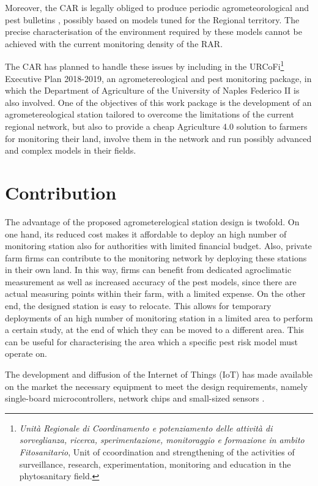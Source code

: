 \documentclass[conference]{IEEEtran}
\begin{document}
Moreover, the CAR is legally obliged to produce periodic agrometeorological and pest bulletins \cite{eu-directive:pesticide}, possibly based on models tuned for the Regional territory.
The precise characterisation of the environment required by these models cannot be achieved with the current monitoring density of the RAR. 

The CAR has planned to handle these issues by including in the URCoFi\footnote{\emph{Unità Regionale di Coordinamento e potenziamento delle attività di sorveglianza, ricerca, sperimentazione, monitoraggio e formazione in ambito Fitosanitario}, Unit of ccoordination and strengthening of the activities of surveillance, research, experimentation, monitoring and education in the phytosanitary field.} Executive Plan 2018-2019, an agrometereological and pest monitoring package, in which the Department of Agriculture of the University of Naples Federico II is also involved. 
One of the objectives of this work package is the development of an agrometereological station tailored to overcome the limitations of the current regional network, but also to provide a cheap Agriculture 4.0 solution to farmers for monitoring their land, involve them in the network and run possibly advanced and complex models in their fields.

\section{Contribution}
The advantage of the proposed agrometerelogical station design is twofold. On one hand, its reduced cost makes it affordable to deploy an high number of monitoring station also for authorities with limited financial budget. 
Also, private farm firms can contribute to the monitoring network by deploying these stations in their own land. In this way, firms can benefit from dedicated agroclimatic measurement as well as increased accuracy of the pest models, since there are actual measuring points within their farm, with a limited expense. On the other end, the designed station is easy to relocate.
This allows for temporary deployments of an high number of monitoring station in a limited area to perform a certain study, at the end of which they can be moved to a different area. This can be useful for characterising the area which a specific pest risk model must operate on.

The development and diffusion of the Internet of Things (IoT) has made available on the market the necessary equipment to meet the design requirements, namely single-board microcontrollers, network chips and small-sized sensors \cite{singh:iot-devices}.
\end{document}

